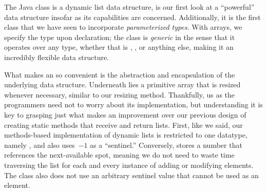 The Java  class is a dynamic list data structure, is our first look at a ``powerful'' data structure insofar as its capabilities are concerned. 
Additionally, it is the first class that we have seen to incorporate \emph{parameterized types}. 
With arrays, we specify the type upon declaration; the  class is \emph{generic} in the sense that it operates over any type, whether that is , , or anything else, making it an incredibly flexible data structure. 

What makes an  so convenient is the abstraction and encapsulation of the underlying data structure. 
Underneath lies a primitive array that is resized whenever necessary, similar to our resizing method. 
Thankfully, us as the programmers need not to worry about its implementation, but understanding it is key to grasping just what makes an improvement over our previous design of creating static methods that receive and return lists. 
First, like we said, our methods-based implementation of dynamic lists is restricted to one datatype, namely , and also uses~$-1$ as a ``sentinel.'' 
Conversely,  stores a number that references the next-available spot, meaning we do not need to waste time traversing the list for each and every instance of adding or modifying elements. 
The  class also does not use an arbitrary sentinel value that cannot be used as an element.

